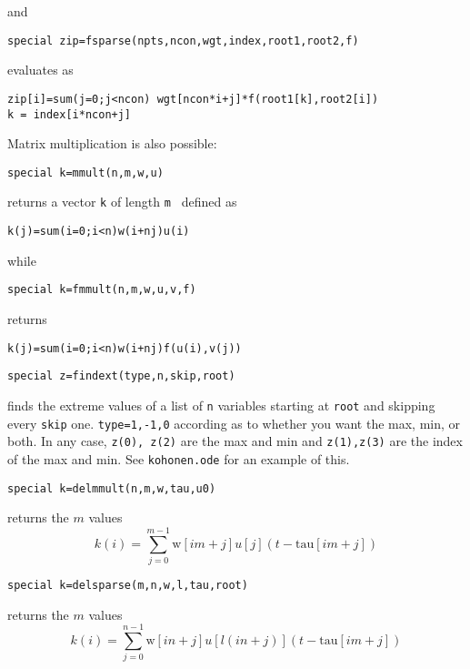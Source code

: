 and 
\begin{verbatim}
special zip=fsparse(npts,ncon,wgt,index,root1,root2,f)
\end{verbatim}
evaluates as 
\begin{verbatim}
zip[i]=sum(j=0;j<ncon) wgt[ncon*i+j]*f(root1[k],root2[i])
k = index[i*ncon+j] 
\end{verbatim}
Matrix multiplication is also possible:
\begin{verbatim}
special k=mmult(n,m,w,u)
\end{verbatim}
returns a vector {\tt k}  of length {\tt m } defined as
\begin{verbatim}
k(j)=sum(i=0;i<n)w(i+nj)u(i)
\end{verbatim}
while
 \begin{verbatim}
special k=fmmult(n,m,w,u,v,f)
\end{verbatim} 
returns
\begin{verbatim}
k(j)=sum(i=0;i<n)w(i+nj)f(u(i),v(j))
\end{verbatim}

\begin{verbatim}
special z=findext(type,n,skip,root)
\end{verbatim}
finds the extreme values of a list of {\tt n} variables starting at {\tt root} and skipping every {\tt skip} one.  {\tt type=1,-1,0} according as to whether you want the max, min, or both. In any case, {\tt z(0), z(2)} are the max and min and {\tt z(1),z(3)} are the index of the max and min.  See {\tt kohonen.ode} for an example of this.  

\begin{verbatim}
special k=delmmult(n,m,w,tau,u0)
\end{verbatim}
returns the $m$ values
\[
k(i)=\sum_{j=0}^{m-1} \mbox{w}[i m + j] u[j](t-\mbox{tau}[i m + j])
\]


\begin{verbatim}
special k=delsparse(m,n,w,l,tau,root)
\end{verbatim}
returns the $m$ values
\[
k(i)=\sum_{j=0}^{n-1} \mbox{w}[i n  + j] u[l(i n +j)](t-\mbox{tau}[i m + j])
\]

\medskip

